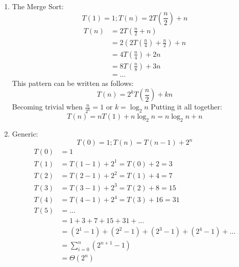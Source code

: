 \documentclass[11pt]{article}
\begin{document}
\begin{enumerate}
\begin{enumerate}
            \item The Merge Sort:
            $$T(1) = 1; T(n) = 2T(\frac{n}{2}) + n$$
            \begin{equation}
                \label{eq2}
                \begin{split}
                    T(n) & = 2T(\frac{n}{2} + n) \\
                         & = 2(2T(\frac{n}{4}) + \frac{n}{2}) + n \\
                         & = 4T(\frac{n}{4}) + 2n \\
                         & = 8T(\frac{n}{8}) + 3n \\
                         & = \ldots
                \end{split}
            \end{equation}
            This pattern can be written as follows: $$T(n) = 2^kT(\frac{n}{2}) + kn$$
            Becoming trivial when $\frac{n}{2^k} = 1$ or $k = \log_{2}n$
            Putting it all together: $$T(n) = nT(1) + n \log_{2}n = n \log_{2}n + n$$
        
            \item Generic:
            $$T(0) = 1; T(n) = T(n - 1) + 2^n$$
            \begin{equation}
                \label{eq3}
                \begin{split}
                    T(0) & = 1 \\
                    T(1) & = T(1 - 1) + 2^1 = T(0) + 2 = 3 \\
                    T(2) & = T(2 - 1) + 2^2 = T(1) + 4 = 7 \\
                    T(3) & = T(3 - 1) + 2^3 = T(2) + 8 = 15 \\
                    T(4) & = T(4 - 1) + 2^4 = T(3) + 16 = 31 \\
                    T(5) & = \ldots \\
                         & = 1 + 3 + 7 + 15 + 31 + \ldots \\
                         & = (2^1 - 1) + (2^2 - 1) + (2^3 - 1) + (2^4 - 1) + \ldots \\
                         & = \sum_{i=0}^{n} (2^{n+1} - 1) \\
                         & = \Theta(2^{n})
                \end{split}
            \end{equation}
        

\end{enumerate}
\end{enumerate}
\end{document}
